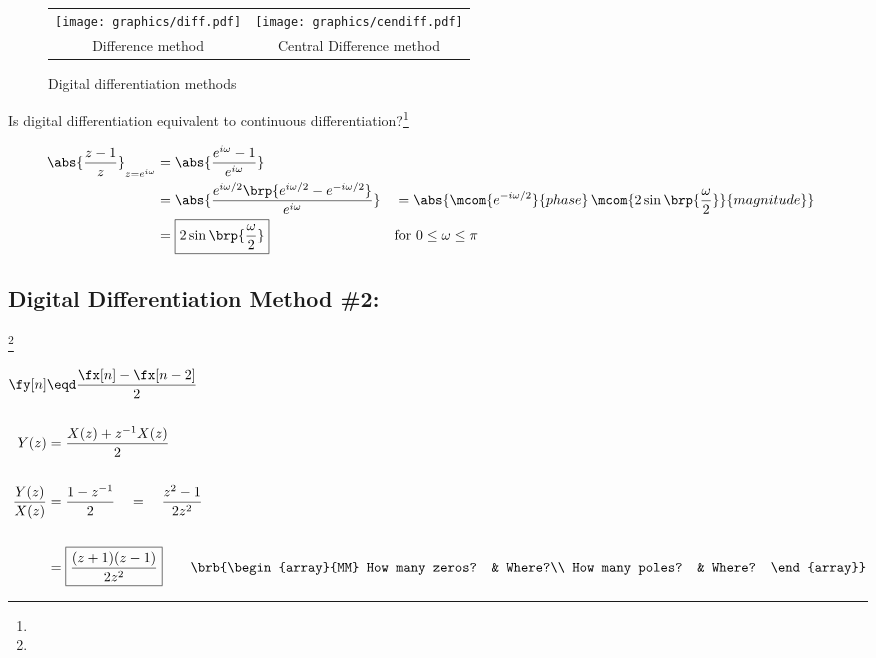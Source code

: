  
\begin{figure}[h]
  \centering
  \begin{tabular}{|c|c|}
      \hline
      \texttt{[image: graphics/diff.pdf]} & \texttt{[image: graphics/cendiff.pdf]}
    \\Difference method & Central Difference method
    \\\hline
  \end{tabular}
  \caption{Digital differentiation methods\label{fig:differentiation}}
\end{figure}

Is digital differentiation equivalent to continuous differentiation?\footnote{}
 
\begin{align*}
  \abs{\frac{z-1}{z}}_{z=e^{i\omega}}
    &= \abs{\frac{e^{i\omega}-1}
                 {e^{i\omega}}
           }
  \\&= \abs{\frac{e^{i\omega/2}\brp{e^{i\omega/2}-e^{-i\omega/2}}}
                 {e^{i\omega}}
           }
   &&= \abs{\mcom{e^{-i\omega/2}}{phase}\,\mcom{{2\sin\brp{\frac{\omega}{2}}}}{magnitude}}
  \\&= \boxed{{2\sin\brp{\frac{\omega}{2}}}} 
    && \text{for $0\le\omega\le\pi$}
\end{align*}

\subsection{Digital Differentiation Method \#2: }
\footnote{}
 
\begin{align*}
  \fy[n]
    &\eqd \frac{\fx[n] - \fx[n-2]}{2}
  \\\\
  Y(z) &= \frac{X(z) + z^{-1}X(z)}{2}
  \\\\
  \frac{Y(z)}{X(z)} &= \frac{1-z^{-1}}{2} \quad=\quad {\frac{z^2-1}{2z^2}}
  \\\\
                    &= \boxed{\frac{(z+1)(z-1)}{2z^2}} 
  \qquad\brb{\begin{array}{MM}
    How many zeros? & Where?\\
    How many poles? & Where?
  \end{array}}
\end{align*}


